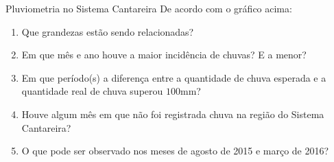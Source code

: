 \begin{task}{ Pluviometria no Sistema Cantareira}
De acordo com o gráfico acima:
\begin{enumerate}
\item {} 
Que grandezas estão sendo relacionadas?

\item {} 
Em que mês e ano houve a maior incidência de chuvas? E a menor?

\item {} 
Em que período(s) a diferença entre a quantidade de chuva esperada e a quantidade real de chuva superou $100$mm?

\item {} 
Houve algum mês em que não foi registrada chuva na região do Sistema Cantareira?

\item {} 
O que pode ser observado nos meses de agosto de 2015 e março de 2016?

\end{enumerate}
\end{task}


